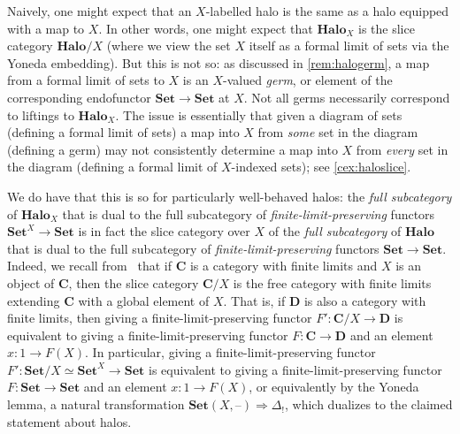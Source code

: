\documentclass[11pt, oneside, article]{memoir}
\theoremstyle{plain}
\theoremstyle{definition}
\theoremstyle{remark}
\newenvironment{warning}
{\renewcommand\qedsymbol{$\lrcorner$}%
  \pushQED{\qed}\mywarning}
{\popQED\endmywarning}
\newcommand{\dash}{{\mathord{\text{--}}}}
\newcommand{\bang}{\mathrm{!}}
\newcommand{\namedcat}[1]{\mathbf{#1}}
\newcommand{\cat}[1]{\mathbf{#1}}
\newcommand{\Halo}{\namedcat{Halo}}
\newcommand{\LHalo}[1]{\Halo_{#1}}
\newcommand{\Set}{\namedcat{Set}}
\newcommand{\slicer}{\Delta_\bang}
\newcommand{\Ho}[1]{#1}
\newcommand{\xX}{X}
\newcommand{\bC}{\cat{C}}
\newcommand{\bD}{\cat{D}}
\begin{document}
\begin{warning}\label{rem:slicefunctorcoslice}
  Naively, one might expect that an $\xX$-labelled halo is the same as
  a halo equipped with a map to $\xX$. In other words, one might
  expect that $\LHalo{\xX}$ is the slice category $\Halo/\xX$ (where
  we view the set $\xX$ itself as a formal limit of sets via the
  Yoneda embedding). But this is not so: as discussed in
  \cref{rem:halogerm}, a map from a formal limit of sets to $\xX$ is
  an $\xX$-valued \emph{germ}, or element of the corresponding
  endofunctor $\Set \to \Set$ at $\xX$. Not all germs necessarily
  correspond to liftings to $\LHalo{\xX}$. The issue is essentially
  that given a diagram of sets (defining a formal limit of sets) a map
  into $\xX$ from \emph{some} set in the diagram (defining a germ) may
  not consistently determine a map into $\xX$ from \emph{every} set in
  the diagram (defining a formal limit of $\xX$-indexed sets); see
  \cref{cex:haloslice}.

  We do have that this is so for particularly well-behaved halos: the
  \emph{full subcategory} of $\LHalo{\xX}$ that is dual to the full
  subcategory of \emph{finite-limit-preserving} functors
  $\Set^X \to \Set$ is in fact the slice category over $\xX$ of the
  \emph{full subcategory} of $\Halo$ that is dual to the full
  subcategory of \emph{finite-limit-preserving} functors
  $\Set \to \Set$. Indeed, we recall from~\cite[Proposition
  1.10.15]{jacobs:logic} that if $\bC$ is a category with finite
  limits and $\xX$ is an object of $\bC$, then the slice category
  $\bC/\xX$ is the free category with finite limits extending $\bC$
  with a global element of $\xX$.  That is, if $\bD$ is also a
  category with finite limits, then giving a finite-limit-preserving
  functor $F' \colon \bC/\xX \to \bD$ is equivalent to giving a
  finite-limit-preserving functor $F \colon \bC \to \bD$ and an
  element $x \colon 1 \to F(\xX)$.
  In particular, giving a finite-limit-preserving functor
  $F' \colon \Set/\xX \simeq \Set^\xX \to \Set$ is equivalent to
  giving a finite-limit-preserving functor $F \colon \Set \to \Set$
  and an element $x \colon 1 \to F(\xX)$, or equivalently by the
  Yoneda lemma, a natural transformation
  $\Ho{\Set}(\xX, \dash) \Rightarrow \slicer$, which dualizes to the
  claimed statement about halos.
\end{warning}
\end{document}
